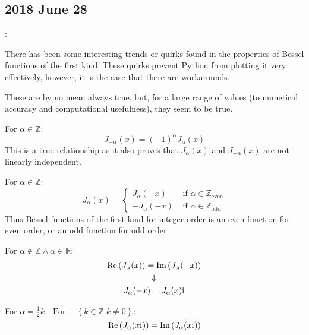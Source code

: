 \documentclass[twocolumn]{article}
\begin{document}
\subsection{2018 June 28}:
\label{subsec:2018_June_28}

There has been some interesting trends or quirks found in the properties of Bessel functions of the first kind. These quirks prevent Python from plotting it very effectively, however, it is the case that there are workarounds.

These are by no mean always true, but, for a large range of values (to numerical accuracy and computational usefulness), they seem to be true.

For $\alpha \in \mathbb{Z}$:
\begin{equation*}
	J_{-\alpha} (x) = \left( -1 \right)^{\alpha} J_{\alpha}(x)
\end{equation*}
This is a true relationship as it also proves that $J_{\alpha} (x)$ and $J_{-\alpha} (x)$ are not linearly independent.

For $\alpha \in \mathbb{Z}$:
\begin{equation*}
	J_\alpha (x) = 
	\begin{cases}
	J_\alpha (-x) & \text{ if } \alpha \in \mathbb{Z}_\text{even} \\ 
	-J_\alpha (-x) & \text{ if } \alpha \in \mathbb{Z}_\text{odd} 
	\end{cases}
\end{equation*}
Thus Bessel functions of the first kind for integer order is an even function for even order, or an odd function for odd order.

For $\alpha \notin \mathbb{Z} \land \alpha \in \mathbb{R}$:
\begin{gather*}
	\text{Re}\left( J_\alpha (x) \right) = \text{Im}\left( J_\alpha (-x) \right) \\
	\Downarrow \\
	J_\alpha (-x) = J_\alpha (x) \mathrm{i}\mkern1mu
\end{gather*}

For $\alpha = \frac{1}{2}k \quad \text{For:} \quad \left\{ \left. k \in \mathbb{Z} \right| k \neq 0 \right\}$:
\begin{equation*}
	\text{Re} \left( J_\alpha (x \mathrm{i}\mkern1mu) \right) = \text{Im} \left( J_\alpha (x \mathrm{i}\mkern1mu) \right)
\end{equation*}
\end{document}
